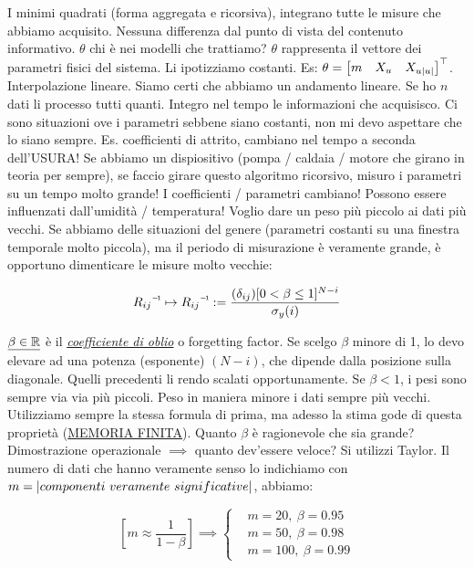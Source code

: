 I minimi quadrati (forma aggregata e ricorsiva), integrano tutte le misure che abbiamo acquisito. Nessuna differenza dal punto di vista del contenuto informativo. $\theta$ chi è nei modelli che trattiamo? $\theta$ rappresenta il vettore dei parametri fisici del sistema. Li ipotizziamo costanti. Es: $\theta=\begin{bmatrix}m&X_u&X_{u\lvert u\rvert}\end{bmatrix}^\top$. Interpolazione lineare. Siamo certi che abbiamo un andamento lineare. Se ho $n$ dati li processo tutti quanti. Integro nel tempo le informazioni che acquisisco. Ci sono situazioni ove i parametri sebbene siano costanti, non mi devo aspettare che lo siano sempre. Es. coefficienti di attrito, cambiano nel tempo a seconda dell'USURA! Se abbiamo un dispiositivo (pompa / caldaia / motore che girano in teoria per sempre), se faccio girare questo algoritmo ricorsivo, misuro i parametri su un tempo molto grande! I coefficienti / parametri cambiano! Possono essere influenzati dall'umidità / temperatura! Voglio dare un peso più piccolo ai dati più vecchi. Se abbiamo delle situazioni del genere (parametri costanti su una finestra temporale molto piccola), ma il periodo di misurazione è veramente grande, è opportuno dimenticare le misure molto vecchie:

\[
	\inv{R_{ij}} \mapsto \inv{R_{ij}} := \frac{(\delta_{ij})[0<\beta\leq 1]^{N-i}}{\sigma_y(i)}
\]

$\underline{\beta\in\mathbb{R}}$ è il \underline{\textit{coefficiente di oblio}} o forgetting factor. Se scelgo $\beta$ minore di 1, lo devo elevare ad una potenza (esponente) $(N-i)$, che dipende dalla posizione sulla diagonale. Quelli precedenti li rendo scalati opportunamente. Se $\beta<1$, i pesi sono sempre via via più piccoli. Peso in maniera minore i dati sempre più vecchi. Utilizziamo sempre la stessa formula di prima, ma adesso la stima gode di questa proprietà (\underline{MEMORIA FINITA}). Quanto $\beta$ è ragionevole che sia grande? Dimostrazione operazionale $\implies$ quanto dev'essere veloce? Si utilizzi Taylor. Il numero di dati che hanno veramente senso lo indichiamo con $m=\cardinality{componenti\ veramente\ significative}$, abbiamo:

\[
	[m\approx\frac{1}{1-\beta}] \implies
	\left\{
	\begin{aligned}
	&m=20,\ \beta=0.95\\
	&m=50,\ \beta=0.98\\
	&m=100,\ \beta=0.99
	\end{aligned}
	\right.
\]

